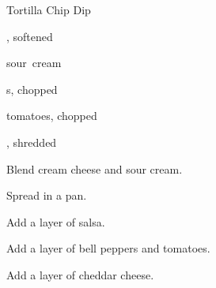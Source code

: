 \begin{recipe}{Tortilla Chip Dip}{}{}

\begin{ingredients}
\item {} , softened
\item \C{\half} sour~cream
\item {}
\item {}s, chopped
\item tomatoes, chopped
\item {}, shredded
\end{ingredients}

\begin{directions}
\item Blend cream cheese and sour cream.
\item Spread in a pan.
\item Add a layer of salsa.
\item Add a layer of bell peppers and tomatoes.
\item Add a layer of cheddar cheese.
\end{directions}

\end{recipe}
